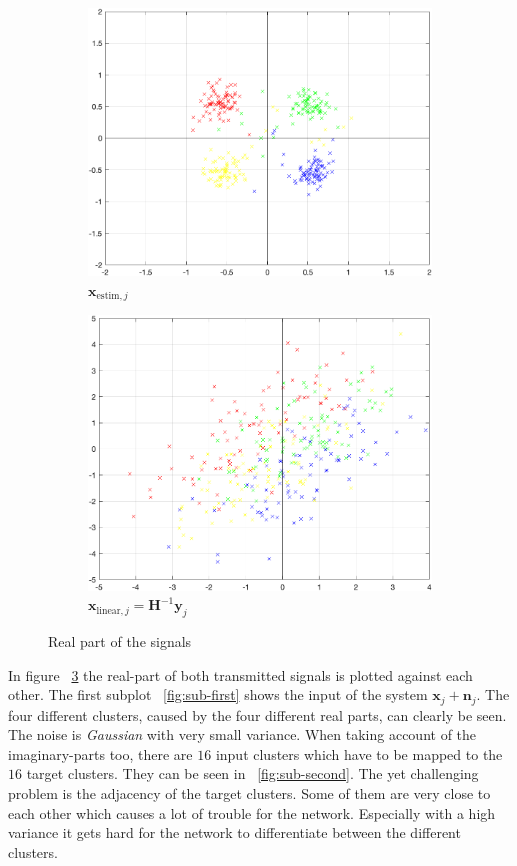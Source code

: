 \documentclass[oneside]{msvreport}%
\newcommand{\B}[1]{\boldsymbol{#1}}
\newcommand{\e}[1]{\emph{#1}}
\begin{document}
\begin{figure}

\begin{subfigure}{.5\textwidth}
  \centering
  \includegraphics[width=.8\linewidth]{estim.png}  
  \caption{$\B{x}_{\text{estim}, j}$}
  \label{fig:sub-third}
\end{subfigure}
\begin{subfigure}{.5\textwidth}
  \centering
  \includegraphics[width=.8\linewidth]{linear.png}  
  \caption{$\B{x}_{\text{linear}, j} = \B{H}^{-1}\B{y}_j$}
  \label{fig:sub-fourth}
\end{subfigure}
\caption{Real part of the signals}
\label{fig:fig}
\end{figure}

\noindent In figure ~\ref{fig:fig} the real-part of both transmitted signals is plotted against each other. The first subplot ~\ref{fig:sub-first} shows the input of the system $\B{x}_j + \B{n}_j$. The four different clusters, caused by the four different real parts, can clearly be seen. The noise is \e{Gaussian} with very small variance. When taking account of the imaginary-parts too, there are $16$ input clusters which have to be mapped to the $16$ target clusters. They can be seen in ~\ref{fig:sub-second}. The yet challenging problem is the adjacency of the target clusters. Some of them are very close to each other which causes a lot of trouble for the network. Especially with a high variance it gets hard for the network to differentiate between the different clusters.\\
\end{document}

